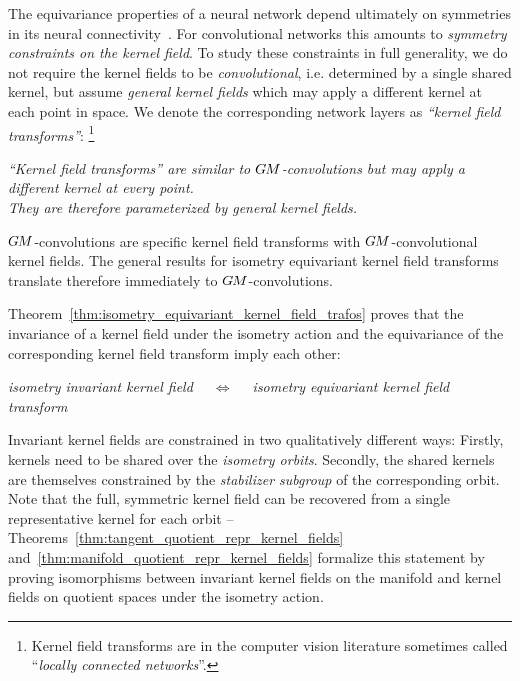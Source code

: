 The equivariance properties of a neural network
depend ultimately on symmetries in its neural connectivity~\cite{ravanbakhsh2017EquivarianceParameterSharing}.
For convolutional networks this amounts to \emph{symmetry constraints on the kernel field}.
To study these constraints in full generality, we do not require the kernel fields to be \emph{convolutional}, i.e. determined by a single shared kernel,
but assume \emph{general kernel fields} which may apply a different kernel at each point in space.
We denote the corresponding network layers as \emph{``kernel field transforms''}:%
\footnote{
    Kernel field transforms are in the computer vision literature sometimes called ``\emph{locally connected networks}''.
}
\begin{center}\it
    ``Kernel field transforms'' are similar to $G\mkern-1.4muM$-convolutions but may apply a different kernel at every point. \\
    They are therefore parameterized by general kernel fields.
\end{center}
$G\mkern-1.4muM$-convolutions are specific kernel field transforms with $G\mkern-1.4muM$-convolutional kernel fields.
The general results for isometry equivariant kernel field transforms translate therefore immediately to $G\mkern-1.4muM$-convolutions.


Theorem~\ref{thm:isometry_equivariant_kernel_field_trafos} proves
that the invariance of a kernel field under the isometry action and the equivariance of the corresponding kernel field transform imply each other:
\begin{center}\it
    isometry invariant kernel field
    $\quad \Longleftrightarrow \quad$
    isometry equivariant kernel field transform
\end{center}
Invariant kernel fields are constrained in two qualitatively different ways:
Firstly, kernels need to be shared over the \emph{isometry orbits}.
Secondly, the shared kernels are themselves constrained by the \emph{stabilizer subgroup} of the corresponding orbit.
Note that the full, symmetric kernel field can be recovered from a single representative kernel for each orbit --
Theorems~\ref{thm:tangent_quotient_repr_kernel_fields} and~\ref{thm:manifold_quotient_repr_kernel_fields} formalize this statement by proving isomorphisms between invariant kernel fields on the manifold and kernel fields on quotient spaces under the isometry action.

